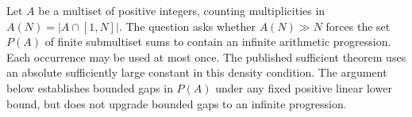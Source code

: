 Let $A$ be a multiset of positive integers, counting multiplicities in $A(N)=|A\cap[1,N]|$. The question asks whether $A(N)\gg N$ forces the set $P(A)$ of finite submultiset sums to contain an infinite arithmetic progression. Each occurrence may be used at most once. The published sufficient theorem uses an absolute sufficiently large constant in this density condition. The argument below establishes bounded gaps in $P(A)$ under any fixed positive linear lower bound, but does not upgrade bounded gaps to an infinite progression.
